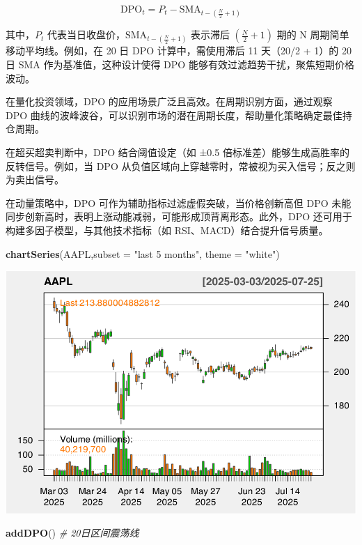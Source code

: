 \documentclass[]{ctexbook}
\newenvironment{Shaded}{\begin{snugshade}}{\end{snugshade}}
\newcommand{\AttributeTok}[1]{\textcolor[rgb]{0.13,0.29,0.53}{#1}}
\newcommand{\CommentTok}[1]{\textcolor[rgb]{0.56,0.35,0.01}{\textit{#1}}}
\newcommand{\FunctionTok}[1]{\textcolor[rgb]{0.13,0.29,0.53}{\textbf{#1}}}
\newcommand{\NormalTok}[1]{#1}
\newcommand{\StringTok}[1]{\textcolor[rgb]{0.31,0.60,0.02}{#1}}
\begin{document}
\[\text{DPO}_t = P_t - \text{SMA}_{t - \left(\frac{N}{2} + 1\right)}\]

其中，\(P_t\) 代表当日收盘价，\(\text{SMA}_{t - \left(\frac{N}{2} + 1\right)}\) 表示滞后 \(\left(\frac{N}{2} + 1\right)\) 期的 N 周期简单移动平均线。例如，在 20 日 DPO 计算中，需使用滞后 11 天（20/2 + 1）的 20 日 SMA 作为基准值，这种设计使得 DPO 能够有效过滤趋势干扰，聚焦短期价格波动。

在量化投资领域，DPO 的应用场景广泛且高效。在周期识别方面，通过观察 DPO 曲线的波峰波谷，可以识别市场的潜在周期长度，帮助量化策略确定最佳持仓周期。

在超买超卖判断中，DPO 结合阈值设定（如 ±0.5 倍标准差）能够生成高胜率的反转信号。例如，当 DPO 从负值区域向上穿越零时，常被视为买入信号；反之则为卖出信号。

在动量策略中，DPO 可作为辅助指标过滤虚假突破，当价格创新高但 DPO 未能同步创新高时，表明上涨动能减弱，可能形成顶背离形态。此外，DPO 还可用于构建多因子模型，与其他技术指标（如 RSI、MACD）结合提升信号质量。

\begin{Shaded}
\begin{Highlighting}[]
\FunctionTok{chartSeries}\NormalTok{(AAPL,}\AttributeTok{subset =} \StringTok{"last 5 months"}\NormalTok{, }\AttributeTok{theme =} \StringTok{"white"}\NormalTok{)}
\end{Highlighting}
\end{Shaded}

\includegraphics[width=0.9\linewidth]{QuantmodHandbook_files/figure-latex/dpo-1}

\begin{Shaded}
\begin{Highlighting}[]
\FunctionTok{addDPO}\NormalTok{()  }\CommentTok{\# 20日区间震荡线}
\end{Highlighting}
\end{Shaded}
\end{document}
